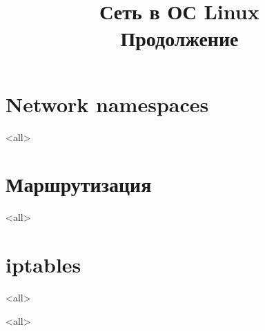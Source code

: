 

\title{Сеть в ОС Linux\\Продолжение}








\begin{frame}
	\frametitle{}
	\titlepage
	\vspace{-0.5cm}
	\begin{center}
	\end{center}
\end{frame}



\section{Network namespaces}
\mode<all>{}

\section{Маршрутизация}
\mode<all>{}

\section{iptables}
\mode<all>{}


\mode<all>

